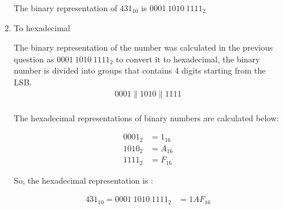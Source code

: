 \documentclass{article}
\begin{document}
\begin{enumerate}[label=\textbf{\arabic*.}]
\begin{enumerate}[label=\textbf{\alph*.}]
\begin{center}
                
            \end{center}
            \vspace{1cm}
            The binary representation of \(431_{10}\) is \(0001 \  1010 \ 1111_2\)
        
    
        \newpage

        \item To hexadecimal \newline
        
        The binary representation of the number was calculated in the previous question as \(0001 \  1010 \ 1111_2\) to convert it to hexadecimal, the binary number is divided into groups that contains 4 digits starting from the LSB.
        \begin{align*}
            0001 \parallel 1010 \parallel 1111 \\
        \end{align*}

        The hexadecimal representations of binary numbers are calculated below: \newline

        \begin{align*}
            0001_2 &= 1_{16} \\
            1010_2 &= A_{16} \\
            1111_2 &= F_{16}
        \end{align*}

        So, the hexadecimal representation is : \newline

        \begin{align*}
            431_{10} = 0001 \ 1010 \ 1111_2 &= 1AF_{16}
        \end{align*}


\end{enumerate}
\end{enumerate}
\end{document}
